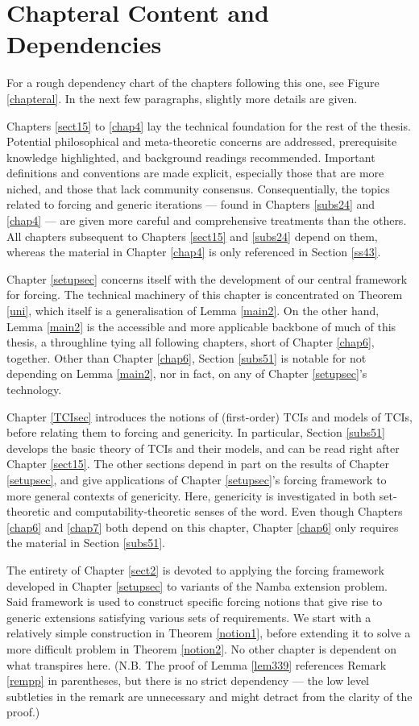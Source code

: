 \documentclass[12pt, twoside]{memoir}
\numberwithin{equation}{section}
\theoremstyle{definition}
\theoremstyle{remark}
\theoremstyle{definition}
\theoremstyle{definition}
\theoremstyle{definition}
\theoremstyle{remark}
\begin{document}
\section{Chapteral Content and Dependencies}

For a rough dependency chart of the chapters following this one, see Figure \ref{chapteral}. In the next few paragraphs, slightly more details are given.

Chapters \ref{sect15} to \ref{chap4} lay the technical foundation for the rest of the thesis. Potential philosophical and meta-theoretic concerns are addressed, prerequisite knowledge highlighted, and background readings recommended. Important definitions and conventions are made explicit, especially those that are more niched, and those that lack community consensus. Consequentially, the topics related to forcing and generic iterations --- found in Chapters \ref{subs24} and \ref{chap4} --- are given more careful and comprehensive treatments than the others. All chapters subsequent to Chapters \ref{sect15} and \ref{subs24} depend on them, whereas the material in Chapter \ref{chap4} is only referenced in Section \ref{ss43}.

Chapter \ref{setupsec} concerns itself with the development of our central framework for forcing. The technical machinery of this chapter is concentrated on Theorem \ref{uni}, which itself is a generalisation of Lemma \ref{main2}. On the other hand, Lemma \ref{main2} is the accessible and more applicable backbone of much of this thesis, a throughline tying all following chapters, short of Chapter \ref{chap6}, together. Other than Chapter \ref{chap6}, Section \ref{subs51} is notable for not depending on Lemma \ref{main2}, nor in fact, on any of Chapter \ref{setupsec}'s technology.

Chapter \ref{TCIsec} introduces the notions of (first-order) TCIs and models of TCIs, before relating them to forcing and genericity. In particular, Section \ref{subs51} develops the basic theory of TCIs and their models, and can be read right after Chapter \ref{sect15}. The other sections depend in part on the results of Chapter \ref{setupsec}, and give applications of Chapter \ref{setupsec}'s forcing framework to more general contexts of genericity. Here, genericity is investigated in both set-theoretic and computability-theoretic senses of the word. Even though Chapters \ref{chap6} and \ref{chap7} both depend on this chapter, Chapter \ref{chap6} only requires the material in Section \ref{subs51}.

The entirety of Chapter \ref{sect2} is devoted to applying the forcing framework developed in Chapter \ref{setupsec} to variants of the Namba extension problem. Said framework is used to construct specific forcing notions that give rise to generic extensions satisfying various sets of requirements. We start with a relatively simple construction in Theorem \ref{notion1}, before extending it to solve a more difficult problem in Theorem \ref{notion2}. No other chapter is dependent on what transpires here. (N.B. The proof of Lemma \ref{lem339} references Remark \ref{rempp} in parentheses, but there is no strict dependency --- the low level subtleties in the remark are unnecessary and might detract from the clarity of the proof.)
\end{document}
